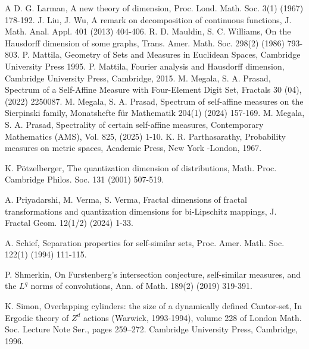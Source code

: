 \documentclass{amsproc}
\theoremstyle{definition}
\theoremstyle{remark}
\numberwithin{equation}{section}
\begin{document}
\begin{thebibliography}{A}
 D. G. Larman, A new theory of dimension, Proc. Lond. Math. Soc. 3(1) (1967) 178-192.
 J. Liu, J. Wu,
     A remark on decomposition of continuous functions, J. Math. Anal. Appl. 401 (2013) 404-406.
  R. D. Mauldin, S. C. Williams, On the Hausdorff dimension of some graphs, Trans. Amer. Math. Soc. 298(2) (1986) 793-803.
      P. Mattila, Geometry of Sets and Measures in Euclidean Spaces, Cambridge University Press 1995.
      P. Mattila, Fourier analysis and Hausdorff dimension, Cambridge University Press, Cambridge, 2015.
     M. Megala, S. A. Prasad, Spectrum of a Self-Affine Measure with Four-Element Digit Set, Fractals 30 (04), (2022) 2250087.
 M. Megala, S. A. Prasad, Spectrum of self-affine measures on the Sierpinski family, Monatshefte f\"ur Mathematik 204(1) (2024) 157-169.
 M. Megala, S. A. Prasad, Spectrality of certain self-affine measures, Contemporary Mathematics (AMS), Vol. 825, (2025) 1-10.
       K. R. Parthasarathy, Probability measures on metric spaces, Academic
      Press, New York -London, 1967.
    
       K. P\"otzelberger, The quantization dimension of distributions, Math. Proc. Cambridge Philos. Soc. 131 (2001) 507-519.
      







 A. Priyadarshi, M. Verma, S. Verma, Fractal dimensions of fractal transformations and quantization dimensions for bi-Lipschitz mappings, J. Fractal Geom. 12(1/2) (2024) 1-33.



 A. Schief, Separation properties for self-similar sets, Proc. Amer. Math. Soc. 122(1) (1994) 111-115.

 P. Shmerkin, On Furstenberg's intersection conjecture, self-similar measures, and the $L^q$ norms of convolutions, Ann. of Math. 189(2) (2019) 319-391.



 K. Simon, Overlapping cylinders: the size of a dynamically defined Cantor-set, In Ergodic theory of $Z^d$ actions (Warwick, 1993-1994), volume 228 of London Math. Soc. Lecture Note Ser., pages 259--272. Cambridge University Press, Cambridge, 1996.


\end{thebibliography}
\end{document}
